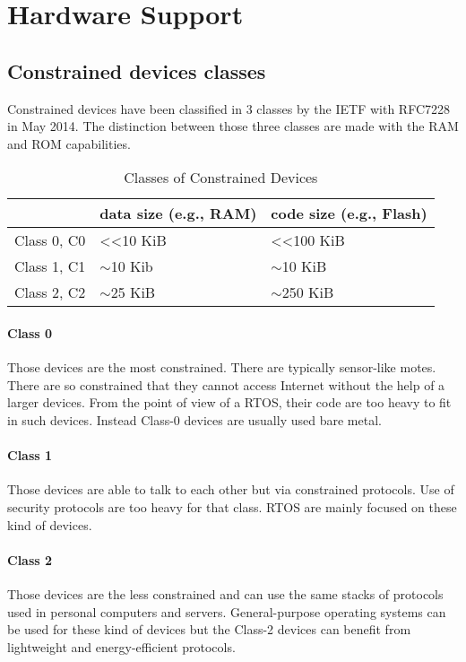 \section{Hardware Support}

\subsection{Constrained devices classes}

Constrained devices have been classified in 3 classes by the IETF with RFC7228 in May 2014. The distinction between those three classes are made with the RAM and ROM capabilities.

\begin{table}[!h]
  \centering
  \begin{tabular}{|l|l|l|}
  \hline
   & data size (e.g., RAM) & code size (e.g., Flash) \\ \hline
  Class 0, C0 & \textless{}\textless 10 KiB & \textless{}\textless 100 KiB \\ %
  Class 1, C1 & $\sim$10 Kib & $\sim$10 KiB \\ %
  Class 2, C2 & $\sim$25 KiB & $\sim$250 KiB \\ \hline
  \end{tabular}
  \caption{Classes of Constrained Devices}
  \label{constrained-devices-classes}
\end{table}

\paragraph{Class 0}
Those devices are the most constrained. There are typically sensor-like motes. There are so constrained that they cannot access Internet without the help of a larger devices. From the point of view of a RTOS, their code are too heavy to fit in such devices. Instead Class-0 devices are usually used bare metal.

\paragraph{Class 1}
Those devices are able to talk to each other but via constrained protocols. Use of security protocols are too heavy for that class. RTOS are mainly focused on these kind of devices.

\paragraph{Class 2}
Those devices are the less constrained and can use the same stacks of protocols used in personal computers and servers. General-purpose operating systems can be used for these kind of devices but the Class-2 devices can benefit from lightweight and energy-efficient protocols.

